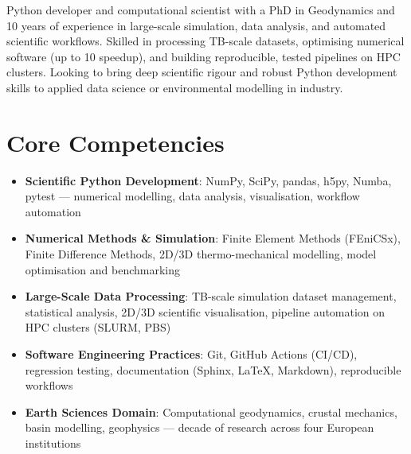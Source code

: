 \documentclass[11pt,a4paper,sans]{moderncv}
\begin{document}
\makecvtitle


\vspace{6pt}
\small{Python developer and computational scientist with a PhD in Geodynamics and 10 years of experience in large-scale simulation, data analysis, and automated scientific workflows. Skilled in processing TB-scale datasets, optimising numerical software (up to 10\texttimes{} speedup), and building reproducible, tested pipelines on HPC clusters. Looking to bring deep scientific rigour and robust Python development skills to applied data science or environmental modelling in industry.}


\section{Core Competencies}
\vspace{1pt}
\begin{itemize}

\item \textbf{Scientific Python Development}: NumPy, SciPy, pandas, h5py, Numba, pytest — numerical modelling, data analysis, visualisation, workflow automation

\item \textbf{Numerical Methods \& Simulation}: Finite Element Methods (FEniCSx), Finite Difference Methods, 2D/3D thermo-mechanical modelling, model optimisation and benchmarking

\item \textbf{Large-Scale Data Processing}: TB-scale simulation dataset management, statistical analysis, 2D/3D scientific visualisation, pipeline automation on HPC clusters (SLURM, PBS)

\item \textbf{Software Engineering Practices}: Git, GitHub Actions (CI/CD), regression testing, documentation (Sphinx, LaTeX, Markdown), reproducible workflows

\item \textbf{Earth Sciences Domain}: Computational geodynamics, crustal mechanics, basin modelling, geophysics — decade of research across four European institutions

\end{itemize}
\end{document}
